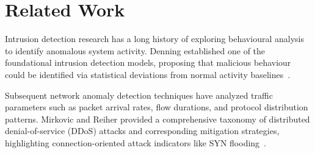 \documentclass[conference]{IEEEtran}
\begin{document}
\section{Related Work}

Intrusion detection research has a long history of exploring behavioural analysis to identify anomalous system activity. Denning established one of the foundational intrusion detection models, proposing that malicious behaviour could be identified via statistical deviations from normal activity baselines~\cite{denning1987ids}.

Subsequent network anomaly detection techniques have analyzed traffic parameters such as packet arrival rates, flow durations, and protocol distribution patterns. Mirkovic and Reiher provided a comprehensive taxonomy of distributed denial-of-service (DDoS) attacks and corresponding mitigation strategies, highlighting connection-oriented attack indicators like SYN flooding~\cite{mirkovic2004survey}.

\begin{table}[htbp]
\centering
\caption{Comparative Analysis of ADG vs. Existing Network Security Frameworks.}
\label{tab:comparison}
\end{table}
\end{document}
